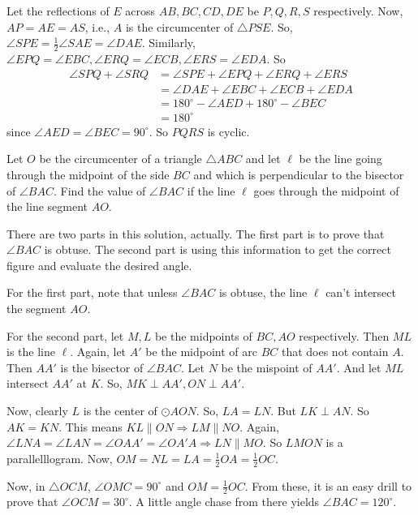 \documentclass{subfile}
\begin{document}
	
	\begin{solution}
		Let the reflections of $E$ across $AB,BC,CD,DE$ be $P,Q,R,S$ respectively. Now, $AP=AE=AS$, i.e., $A$ is the circumcenter of $\triangle PSE$. So, $\angle SPE=\frac{1}{2}\angle SAE=\angle DAE$. Similarly, $\angle EPQ=\angle EBC, \angle ERQ=\angle ECB, \angle ERS=\angle EDA$. 
		So
		\begin{align*}
		    \angle SPQ+\angle SRQ & =\angle SPE+\angle EPQ+\angle ERQ+\angle ERS\\
		                          & =\angle DAE+\angle EBC+\angle ECB+\angle EDA\\ 
		                          & =180^{\circ}-\angle AED+180^{\circ}-\angle BEC\\
		                          & =180^{\circ}
        \end{align*}
	since $\angle AED=\angle BEC=90^{\circ}$. So $PQRS$ is cyclic.
	\end{solution}
	
	
	\begin{problem}
		Let $O$ be the circumcenter of a triangle $\triangle ABC$ and let $\ell$ be the line going through the midpoint of the side $BC$ and which is perpendicular to the bisector of $\angle BAC$. Find the value of $\angle BAC$ if the line $\ell$ goes through the midpoint of the line segment $AO$.
	\end{problem}
	
	\begin{solution}
		There are two parts in this solution, actually. The first part is to prove that $\angle BAC$ is obtuse. The second part is using this information to get the correct figure and evaluate the desired angle. 
		
		For the first part, note that unless $\angle BAC$ is obtuse, the line $\ell$ can't intersect the segment $AO$. 
		
		For the second part, let $M,L$ be the midpoints of $BC,AO$ respectively. Then $ML$ is the line $\ell$. Again, let $A'$ be the midpoint of arc $BC$ that does not contain $A$. Then $AA'$ is the bisector of $\angle BAC$. Let $N$ be the mispoint of $AA'$. And let $ML$ intersect $AA'$ at $K$. So, $MK\perp AA',ON\perp AA'$.
		
		Now, clearly $L$ is the center of $\odot AON$. So, $LA=LN$. But $LK\perp AN$. So $AK=KN$. This means $KL\parallel ON\Rightarrow LM\parallel NO$. Again, $\angle LNA=\angle LAN=\angle OAA'=\angle OA'A\Rightarrow LN\parallel MO$. So $LMON$ is a parallelllogram. Now, $OM=NL=LA=\frac{1}{2}OA=\frac{1}{2}OC$.
		
		Now, in $\triangle OCM$, $\angle OMC=90^{\circ}$ and $OM=\frac{1}{2}OC$. From these, it is an easy drill to prove that $\angle OCM=30^{\circ}$. A little angle chase from there yields $\angle BAC=120^{\circ}$. 
	\end{solution}
	
\end{document}
